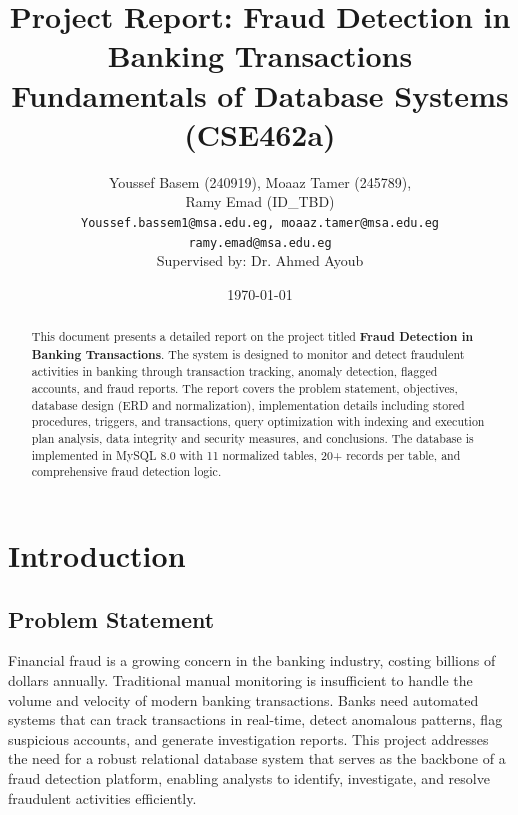 \documentclass[a4paper,12pt]{article}
\title{Project Report: Fraud Detection in Banking Transactions \\ \large Fundamentals of Database Systems (CSE462a)}
\author{
Youssef Basem (240919), Moaaz Tamer (245789), \\ Ramy Emad (ID\_TBD) \\
\texttt{Youssef.bassem1@msa.edu.eg, moaaz.tamer@msa.edu.eg} \\
\texttt{ramy.emad@msa.edu.eg} \\
Supervised by: Dr. Ahmed Ayoub}
\date{\today}
\begin{document}
\maketitle

\begin{abstract}
This document presents a detailed report on the project titled \textbf{Fraud Detection in Banking Transactions}. The system is designed to monitor and detect fraudulent activities in banking through transaction tracking, anomaly detection, flagged accounts, and fraud reports. The report covers the problem statement, objectives, database design (ERD and normalization), implementation details including stored procedures, triggers, and transactions, query optimization with indexing and execution plan analysis, data integrity and security measures, and conclusions. The database is implemented in MySQL 8.0 with 11 normalized tables, 20+ records per table, and comprehensive fraud detection logic.
\end{abstract}
\newpage

\tableofcontents
\clearpage
\newpage

\section{Introduction}

\subsection{Problem Statement}
Financial fraud is a growing concern in the banking industry, costing billions of dollars annually. Traditional manual monitoring is insufficient to handle the volume and velocity of modern banking transactions. Banks need automated systems that can track transactions in real-time, detect anomalous patterns, flag suspicious accounts, and generate investigation reports. This project addresses the need for a robust relational database system that serves as the backbone of a fraud detection platform, enabling analysts to identify, investigate, and resolve fraudulent activities efficiently.
\end{document}
